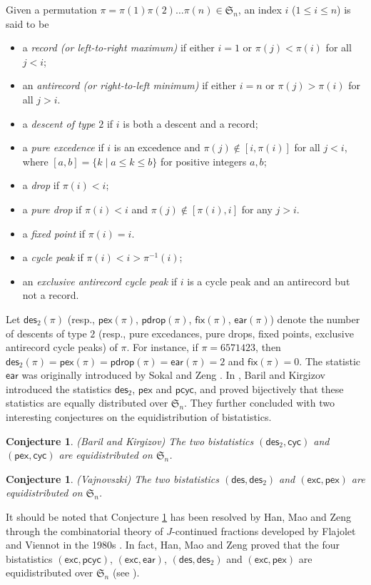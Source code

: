 \documentclass[12pt]{article}
\numberwithin{equation}{section}
\theoremstyle{plain}
\newtheorem{conjecture}[theorem]{Conjecture}
\def\des{\mathsf{des}}
\def\ear{\mathsf{ear}}
\def\cyc{\mathsf{cyc}}
\def\fix{\mathsf{fix}}
\def\pex{\mathsf{pex}}
\def\pcyc{\mathsf{pcyc}}
\def\exc{\mathsf{exc}}
\def\pdrop{\mathsf{pdrop}}
\begin{document}
	 Given a permutation $\pi=\pi(1)\pi(2)\ldots \pi(n)\in \mathfrak{S}_n$, an index $i$ ($1\leq i\leq n$) is said to be 
	\begin{itemize}
		\item a {\em record (or left-to-right maximum)}  if either $i=1$ or $\pi(j)<\pi(i)$ for all $j<i$;
		\item an {\em antirecord (or right-to-left minimum)} if either $i=n$ or $\pi(j)>\pi(i)$  for all $j>i$. 
		\item a	{\em descent of type $2$} if  $i$ is both a descent  and  a record;
		\item a {\em pure excedence} if $i$ is an excedence and $\pi(j)\notin [i, \pi(i)]$ for all $j<i$, where $[a,b]=\{k\mid a\leq k\leq b\}$  for positive integers $a,b$;
		\item a {\em drop} if $\pi(i)<i$;
		\item a {\em pure drop} if $\pi(i)<i$ and $\pi(j)\notin [\pi(i),  i]$ for any $j>i$.
		\item a {\em fixed point} if $\pi(i)=i$.
		\item a {\em cycle peak} if $\pi(i)<i>\pi^{-1}(i)$;
		\item an {\em exclusive antirecord cycle peak }  if $i$ is a cycle peak and an antirecord but not a record. 
	\end{itemize}
	Let $\des_2(\pi)$ (resp., $\pex(\pi)$, $\pdrop(\pi)$, $\fix(\pi)$, $\ear(\pi)$) denote the number of descents of type $2$ (resp., pure excedances, pure drops, fixed points,  exclusive antirecord cycle peaks) of $\pi$.     For instance, if $\pi=6571423$,  then    $\des_2(\pi)= \pex(\pi)=\pdrop(\pi)=\ear(\pi)=2$ and $\fix(\pi)=0$.  The statistic $\ear$ was originally introduced by Sokal and Zeng \cite{sokal2022multivariate}.  In \cite{baril2021transformation}, Baril and Kirgizov introduced the statistics $\des_2$, $\pex$ and $\pcyc$, and proved bijectively that these statistics are equally distributed over $\mathfrak{S}_n$. They further concluded with two interesting 
	conjectures on the equidistribution of bistatistics. 
	
	\begin{conjecture}\label{con1}{\upshape(Baril and Kirgizov) }The two bistatistics $(\des_2, \cyc)$ and $(\pex, \cyc)$ are
		equidistributed on $\mathfrak{S}_n$. 
	\end{conjecture}
	
	\begin{conjecture}\label{con2}{\upshape(Vajnovszki) }The two bistatistics $(\des, \des_2)$ and $(\exc, \pex)$ are
		equidistributed on $\mathfrak{S}_n$. 
	\end{conjecture}
	It should be noted that Conjecture \ref{con2} has been resolved by Han, Mao and Zeng \cite{han2021equidistributions} through the
	combinatorial theory of $J$-continued fractions developed by Flajolet and Viennot in
	the 1980s \cite{flajolet1980combinatorial, francon1979permutations}.   In fact,  Han, Mao and Zeng proved that  the four bistatistics $(\exc, \pcyc)$, $(\exc, \ear)$, $(\des, \des_2)$ and $(\exc, \pex)$ are equidistributed over $\mathfrak{S}_n$ (see \cite[Corollary 1.6]{han2021equidistributions}).
	
\end{document}
